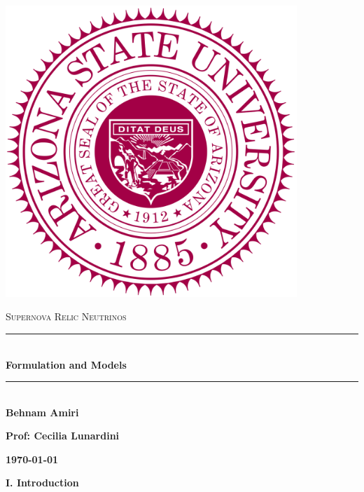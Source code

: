 \documentclass[fleqn]{article}
\begin{document}
  \begin{titlepage}

    \newcommand{\HRule}{\rule{\linewidth}{0.5mm}}

    \center

    \begin{center}
      \includegraphics[height=11cm, width=11cm]{asu.png}
    \end{center}

    \vline

    \textsc{\LARGE Supernova Relic Neutrinos}\\[1.5cm]

    \HRule \\[0.5cm]
    { \huge \bfseries Formulation and Models}\\[0.4cm] 
    \HRule \\[1.0cm]

    \textbf{Behnam Amiri}

    \bigbreak

    \textbf{Prof: Cecilia Lunardini}

    \bigbreak

    \textbf{{\large \today}\\[2cm]}

    \vfill

  \end{titlepage}


  \textbf{I. Introduction}

  \vspace{10px}
\end{document}
